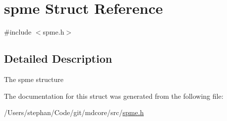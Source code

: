 \hypertarget{structspme}{\section{spme Struct Reference}
\label{structspme}
}


{\ttfamily \#include $<$spme.\-h$>$}



\subsection{Detailed Description}
The spme structure 

The documentation for this struct was generated from the following file\-:\begin{DoxyCompactItemize}
\item 
/\-Users/stephan/\-Code/git/mdcore/src/\hyperlink{spme_8h}{spme.\-h}\end{DoxyCompactItemize}
